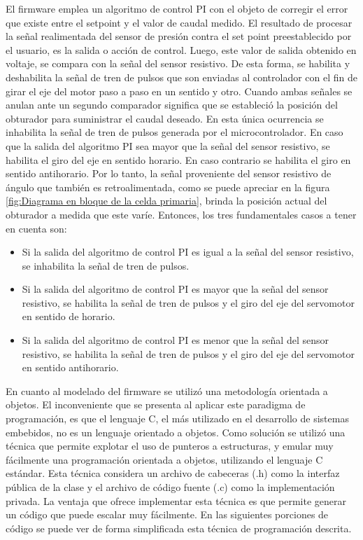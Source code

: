 El firmware emplea un algoritmo de control PI con el objeto de corregir el error que existe entre el setpoint y el valor de caudal medido. El resultado de procesar la señal realimentada del sensor de presión contra el set point preestablecido por el usuario, es la salida o acción de control. Luego, este valor de salida obtenido en voltaje, se compara con la señal del sensor resistivo. De esta forma, se habilita y deshabilita la señal de tren de pulsos que son enviadas al controlador con el fin de girar el eje del motor paso a paso en un sentido y otro.
Cuando ambas señales se anulan ante un segundo comparador significa que  se estableció la posición del obturador para suministrar el caudal deseado. En esta única ocurrencia se inhabilita la señal de tren de pulsos generada por el microcontrolador. En caso que la salida del algoritmo PI sea mayor que la señal del sensor resistivo, se habilita el giro del eje en sentido horario. En caso contrario se habilita el giro en sentido antihorario.     
Por lo tanto, la señal proveniente del sensor resistivo de ángulo que también es retroalimentada, como se puede apreciar en la figura \ref{fig:Diagrama en bloque de la celda primaria}, brinda la posición actual del obturador a medida que este varíe. Entonces, los tres fundamentales casos a tener en cuenta son:
\begin{itemize}

\item Si la salida del algoritmo de control PI es igual a la señal del sensor resistivo, se inhabilita la señal de tren de pulsos.
\item Si la salida del algoritmo de control PI es mayor que la señal del sensor resistivo, se habilita la señal de tren de pulsos y el giro del eje del servomotor en sentido de horario.
\item Si la salida del algoritmo de control PI es menor que la señal del sensor resistivo, se habilita la señal de tren de pulsos y el giro del eje del servomotor en sentido antihorario.

\end{itemize}

En cuanto al modelado del firmware se utilizó una metodología orientada a objetos. El inconveniente que se presenta al aplicar este paradigma de programación, es que el lenguaje C, el más utilizado en el desarrollo de sistemas embebidos, no es un lenguaje orientado a objetos.
Como solución se utilizó una técnica que permite explotar el uso de punteros a estructuras, y emular muy fácilmente una programación orientada a objetos, utilizando el lenguaje C estándar\citep{ADT}. Esta técnica considera un archivo de cabeceras (.h) como la interfaz pública de la clase y el archivo de código fuente (.c) como la implementación privada.
La ventaja que ofrece implementar esta técnica es que permite generar un código que puede escalar muy fácilmente.
En las siguientes porciones de código se puede ver de forma simplificada esta técnica de programación descrita.


